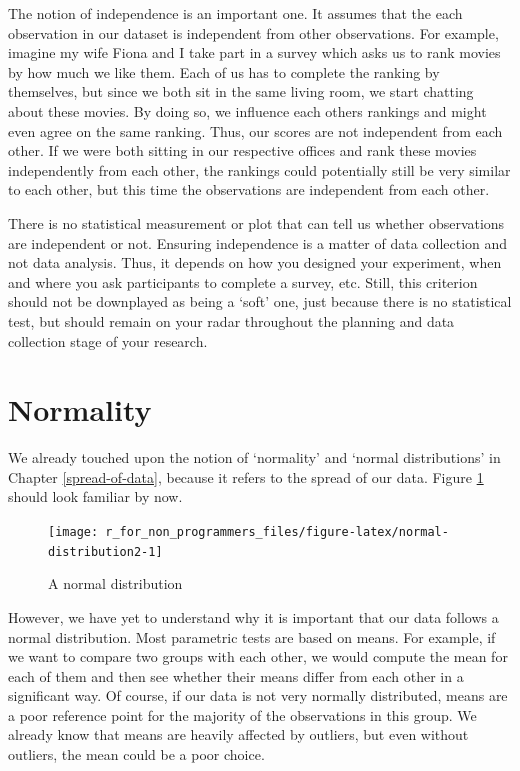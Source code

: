 \documentclass[
]{book}
\begin{document}
The notion of independence is an important one. It assumes that the each observation in our dataset is independent from other observations. For example, imagine my wife Fiona and I take part in a survey which asks us to rank movies by how much we like them. Each of us has to complete the ranking by themselves, but since we both sit in the same living room, we start chatting about these movies. By doing so, we influence each others rankings and might even agree on the same ranking. Thus, our scores are not independent from each other. If we were both sitting in our respective offices and rank these movies independently from each other, the rankings could potentially still be very similar to each other, but this time the observations are independent from each other.

There is no statistical measurement or plot that can tell us whether observations are independent or not. Ensuring independence is a matter of data collection and not data analysis. Thus, it depends on how you designed your experiment, when and where you ask participants to complete a survey, etc. Still, this criterion should not be downplayed as being a `soft' one, just because there is no statistical test, but should remain on your radar throughout the planning and data collection stage of your research.

\hypertarget{normality}{%
\section{Normality}\label{normality}}

We already touched upon the notion of `normality' and `normal distributions' in Chapter \ref{spread-of-data}, because it refers to the spread of our data. Figure \ref{fig:normal-distribution2} should look familiar by now.

\begin{figure}

{\centering \texttt{[image: r\_for\_non\_programmers\_files/figure-latex/normal-distribution2-1]} 

}

\caption{A normal distribution}\label{fig:normal-distribution2}
\end{figure}

However, we have yet to understand why it is important that our data follows a normal distribution. Most parametric tests are based on means. For example, if we want to compare two groups with each other, we would compute the mean for each of them and then see whether their means differ from each other in a significant way. Of course, if our data is not very normally distributed, means are a poor reference point for the majority of the observations in this group. We already know that means are heavily affected by outliers, but even without outliers, the mean could be a poor choice.
\end{document}
